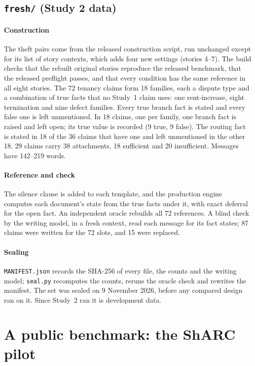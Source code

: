 \documentclass[acmsmall,screen,nonacm]{acmart}
\begin{document}
\subsection{\texttt{fresh/} (Study 2 data)}
\label{app:data-fresh}

\paragraph{Construction}
The theft pairs come from the released construction script, run unchanged except for its list of story contexts, which adds four new settings (stories 4--7). The build checks that the rebuilt original stories reproduce the released benchmark, that the released preflight passes, and that every condition has the same reference in all eight stories. The 72 tenancy claims form 18 families, each a dispute type and a combination of true facts that no Study~1 claim uses: one rent-increase, eight termination and nine defect families. Every true branch fact is stated and every false one is left unmentioned. In 18 claims, one per family, one branch fact is raised and left open; its true value is recorded (9 true, 9 false). The routing fact is stated in 18 of the 36 claims that have one and left unmentioned in the other 18. 29 claims carry 38 attachments, 18 sufficient and 20 insufficient. Messages have 142--219 words.

\paragraph{Reference and check}
The silence clause is added to each template, and the production engine computes each document's state from the true facts under it, with exact deferral for the open fact. An independent oracle rebuilds all 72 references. A blind check by the writing model, in a fresh context, read each message for its fact states; 87 claims were written for the 72 slots, and 15 were replaced.

\paragraph{Sealing}
\texttt{MANIFEST.json} records the SHA-256 of every file, the counts and the writing model; \texttt{seal.py} recomputes the counts, reruns the oracle check and rewrites the manifest. The set was sealed on 9 November 2026, before any compared design ran on it. Since Study~2 ran it is development data.


\section{A public benchmark: the ShARC pilot}
\label{supp:sharc}
\end{document}
